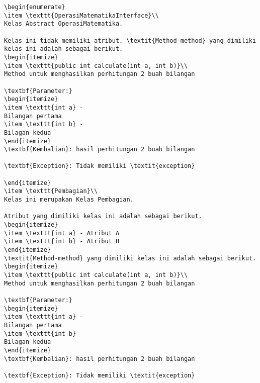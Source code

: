 \begin{lstlisting}[caption=Hasil Pengujian Pertama]
\begin{enumerate}
\item \texttt{OperasiMatematikaInterface}\\ 
Kelas Abstract OperasiMatematika.

Kelas ini tidak memiliki atribut. \textit{Method-method} yang dimiliki kelas ini adalah sebagai berikut.
\begin{itemize}
\item \texttt{public int calculate(int a, int b)}\\ 
Method untuk menghasilkan perhitungan 2 buah bilangan

\textbf{Parameter:}
\begin{itemize}
\item \texttt{int a} - 
Bilangan pertama
\item \texttt{int b} - 
Bilagan kedua
\end{itemize}
\textbf{Kembalian}: hasil perhitungan 2 buah bilangan

\textbf{Exception}: Tidak memiliki \textit{exception}

\end{itemize}
\item \texttt{Pembagian}\\ 
Kelas ini merupakan Kelas Pembagian.

Atribut yang dimiliki kelas ini adalah sebagai berikut.
\begin{itemize}
\item \texttt{int a} - Atribut A
\item \texttt{int b} - Atribut B
\end{itemize}
\textit{Method-method} yang dimiliki kelas ini adalah sebagai berikut.
\begin{itemize}
\item \texttt{public int calculate(int a, int b)}\\ 
Method untuk menghasilkan perhitungan 2 buah bilangan

\textbf{Parameter:}
\begin{itemize}
\item \texttt{int a} - 
Bilangan pertama
\item \texttt{int b} - 
Bilagan kedua
\end{itemize}
\textbf{Kembalian}: hasil perhitungan 2 buah bilangan

\textbf{Exception}: Tidak memiliki \textit{exception}


\end{lstlisting}
